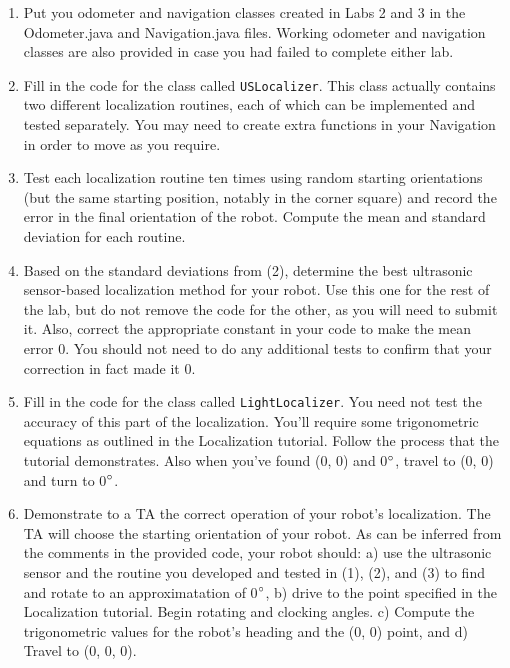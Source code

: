 \documentclass[11pt]{article}
\begin{document}
\begin{enumerate}
\item Put you odometer and navigation classes created in Labs 2 and 3 in the Odometer.java and Navigation.java files. Working odometer and navigation classes are also provided in case you had failed to complete either lab.
\item Fill in the code for the class called \texttt{USLocalizer}. This class actually contains two different localization routines, each of which can be implemented and tested separately. You may need to create extra functions in your Navigation in order to move as you require.
\item Test each localization routine ten times using random starting orientations (but the same starting position, notably in the corner square) and record the error in the final orientation of the robot. Compute the mean and standard deviation for each routine.
\item Based on the standard deviations from (2), determine the best ultrasonic sensor-based localization method for your robot. Use this one for the rest of the lab, but do not remove the code for the other, as you will need to submit it. Also, correct the appropriate constant in your code to make the mean error 0. You should not need to do any additional tests to confirm that your correction in fact made it 0.
\item Fill in the code for the class called \texttt{LightLocalizer}. You need not test the accuracy of this part of the localization. You'll require some trigonometric equations as outlined in the Localization tutorial. Follow the process that the tutorial demonstrates. Also when you've found (0, 0) and 0$\degree$, travel to (0, 0) and turn to 0$\degree$.
\item Demonstrate to a TA the correct operation of your robot's localization. The TA will choose the starting orientation of your robot. As can be inferred from the comments in the provided code, your robot should: a) use the ultrasonic sensor and the routine you developed and tested in (1), (2), and (3) to find and rotate to an approximatation of 0$\degree$, b) drive to the point specified in the Localization tutorial. Begin rotating and clocking angles. c) Compute the trigonometric values for the robot's heading and the (0, 0) point, and d) Travel to (0, 0, 0).
\end{enumerate}
\newpage
\end{document}
